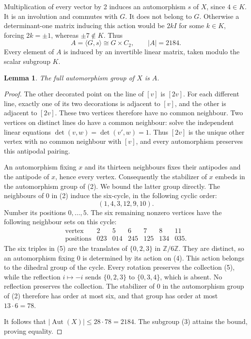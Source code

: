 \documentclass[11pt,a4paper]{article}
\newtheorem{lemma}[theorem]{Lemma}
\newcommand{\gen}[1]{\langle #1\rangle}
\newcommand{\Aut}{\operatorname{Aut}}
\begin{document}
Multiplication of every vector by 2 induces an automorphism $s$ of
$X$, since $4\in K$. It is an involution and commutes with $G$.
It does not belong to $G$. Otherwise a determinant-one matrix inducing
this action would be $2kI$ for some $k\in K$, forcing
$2k=\pm1$, whereas $\pm7\notin K$. Thus
\[
             A=\gen{G,s}\cong G\times C_2,
             \qquad |A|=2184.                            \tag{3}
\]
Every element of $A$ is induced by an invertible linear matrix, taken
modulo the scalar subgroup $K$.

\begin{lemma}\label{full-aut}
The full automorphism group of $X$ is $A$.
\end{lemma}
\begin{proof}
The other decorated point on the line of $[v]$ is $[2v]$. For each
different line, exactly one of its two decorations is adjacent to
$[v]$, and the other is adjacent to $[2v]$. These two vertices
therefore have no common neighbour. Two vertices on distinct lines
do have a common neighbour: solve the independent linear equations
$\det(v,w)=\det(v',w)=1$. Thus $[2v]$ is the unique other vertex
with no common neighbour with $[v]$, and every automorphism preserves
this antipodal pairing.

An automorphism fixing $x$ and its thirteen neighbours fixes their
antipodes and the antipode of $x$, hence every vertex. Consequently
the stabilizer of $x$ embeds in the automorphism group of (2).
We bound the latter group directly. The neighbours of 0 in (2)
induce the six-cycle, in the following cyclic order:
\[
                    (1,4,3,12,9,10).                     \tag{4}
\]
Number its positions $0,\ldots,5$. The six remaining nonzero
vertices have the following neighbour sets on this cycle:
\[
\begin{array}{c|rrrrrr}
\text{vertex}&2&5&6&7&8&11\\\hline
\text{positions}&023&014&245&125&134&035.
\end{array}                                               \tag{5}
\]
The six triples in (5) are the translates of $\{0,2,3\}$ in
$\mathbb Z/6\mathbb Z$. They are distinct, so an automorphism
fixing 0 is determined by its action on (4). This action belongs
to the dihedral group of the cycle. Every rotation preserves
the collection (5), while the reflection $i\mapsto-i$ sends
$\{0,2,3\}$ to $\{0,3,4\}$, which is absent. No reflection
preserves the collection. The stabilizer of 0 in the automorphism
group of (2) therefore has order at most six, and that group
has order at most $13\cdot6=78$.

It follows that $|\Aut(X)|\le28\cdot78=2184$. The subgroup (3)
attains the bound, proving equality.
\end{proof}
\end{document}
